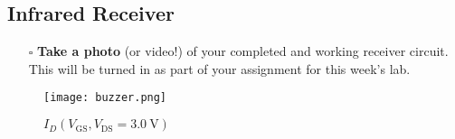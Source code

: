 \documentclass[12pt]{article}
\begin{document}
\subsection{Infrared Receiver}
\setcounter{enumi}{3}
\begin{enumerate}
\item[$\square$] \textbf{Take a photo} (or video!) of your completed and working receiver circuit.  This will be turned in as part of your assignment for this week's lab.
\end{enumerate}

\begin{figure}[h]
    \centering
    \texttt{[image: buzzer.png]}
    \caption{$I_D(V_{\mathrm{GS}}, V_{\mathrm{DS}} = \SI{3.0}{\volt})$}
    \label{fig:Buzzer}
\end{figure}
\end{document}
